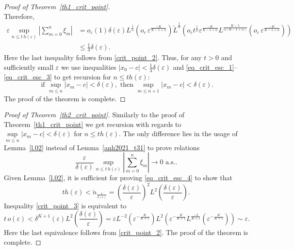 \documentclass{article}
\theoremstyle{plain}
\theoremstyle{definition}
\theoremstyle{remark}
\newcommand{\ra }{ \rightarrow} %
\begin{document}
\begin{proof}[Proof of Theorem~\ref{th1_crit_point}]
\begin{equation*}
\end{equation*}
Therefore, 
\begin{equation}\label{eq_crit_esc_3}
\begin{split}
    \varepsilon  \sup_{n\leqslant t\, h(\varepsilon)}\left|\sum_{m=0}^n \xi_m \right| &  =  o_{\varepsilon}\left( 1\right) \delta(\varepsilon)  L^{\frac{1}{\alpha}}\left(o_{\varepsilon}\,\varepsilon^{\frac{-K}{K-1+\alpha}}\right) \widetilde{L} ^{\frac{1}{\alpha}} \left( o_{\varepsilon} t^{\frac{1}{\alpha}} \varepsilon^{\frac{-K}{K-1+\alpha}} L^{\frac{K-1}{\alpha(K-1+\alpha)}}  ( o_{\varepsilon}\,\varepsilon^{\frac{-K}{K-1+\alpha}})\right) \\ 
    & \leqslant \frac{1}{3} \delta(\varepsilon).
\end{split}
\end{equation}
Here the last inequality follows from \eqref{crit_point_2}.
Thus, for any $t>0$ and sufficiently small $\varepsilon$ we use inequalities $|x_0 - c|< \frac{1}{3} \delta(\varepsilon)$ and \eqref{eq_crit_esc_1}--\eqref{eq_crit_esc_3} to get recursion for $n \leqslant t h(\varepsilon):$
\begin{equation*}
    \text{ if }\sup\limits_{m \leqslant n} |x_m - c | < \delta(\varepsilon), \text{ then } \sup\limits_{m \leqslant n+1} |x_m - c | < \delta(\varepsilon).
\end{equation*}
The proof of the theorem is complete.
\end{proof}

\begin{proof}[Proof of Theorem~\ref{th2_crit_point}]
Similarly to the proof of Theorem~\ref{th1_crit_point} we get recursion with regards to $\sup\limits_{m \leqslant n} |x_m - c | < \delta(\varepsilon)$
for $n \leqslant t h(\varepsilon).$ The only difference lies in the usage of Lemma~\ref{l.02} instead of Lemma~\ref{anh2021_t31} to prove relations
\begin{equation}\label{eq_crit_esc_4}
    \frac{\varepsilon}{\delta(\varepsilon)}  \sup_{n\leqslant t\, h(\varepsilon)}\left|\sum_{m=0}^n \xi_m \right|  \ra 0  \text{ a.s..}
\end{equation}
Given Lemma~\ref{l.02}, it is sufficient for proving \eqref{eq_crit_esc_4} to show that 
\begin{equation}\label{crit_point_3}
t h(\varepsilon) < \check{n}_{\frac{\varepsilon}{\delta(\varepsilon)}}=\left(\frac{\delta(\varepsilon)}{\varepsilon}\right)^2L^2\left(\frac{\delta(\varepsilon)}{\varepsilon}\right).
\end{equation}
Inequality \eqref{crit_point_3} is equivalent to
\begin{equation*}
    t\,o\!\left(\varepsilon\right) < \delta^{K+1}(\varepsilon) L^{2}\left(\frac{\delta(\varepsilon)}{\varepsilon}\right) = \varepsilon L^{-2}\left(\varepsilon^{-\frac{K}{K+1}}\right) L^{2}\left(\varepsilon^{-\frac{K}{K+1}} L^{\frac{-2}{K+1}}\left(\varepsilon^{-\frac{K}{K+1}}\right) \right) \sim \varepsilon.
\end{equation*}
Here the last equivalence follows from \eqref{crit_point_2}. The proof of the theorem is complete.
\end{proof}
\end{document}
